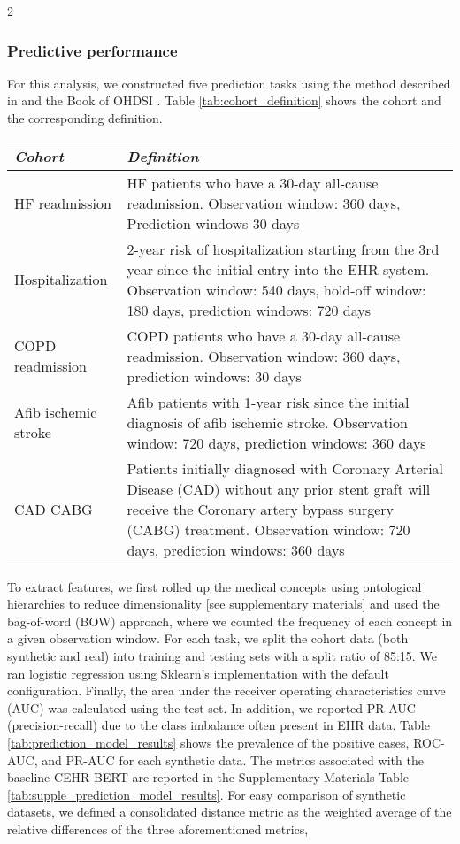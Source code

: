 \begin{multicols}{2}
\subsubsection{Predictive performance}
For this analysis, we constructed five prediction tasks using the method described in \cite{Pang2021} and the Book of OHDSI \cite{ohdsi2019book}. Table \ref{tab:cohort_definition} shows the cohort and the corresponding definition.
\begingroup
\setlength{\tabcolsep}{10pt} %
\renewcommand{\arraystretch}{1.8} %
\begin{table*}[t]
  \centering
  \begin{tabular}{p{4.0cm}p{12.0cm}}
  \toprule 
  \textit{Cohort}  & \textit{Definition}\\
  \midrule
    HF readmission & HF patients who have a 30-day all-cause readmission. Observation window: 360 days, Prediction windows 30 days \\
    Hospitalization & 2-year risk of hospitalization starting from the 3rd year since the initial entry into the EHR system. Observation window: 540 days, hold-off window: 180 days, prediction windows: 720 days  \\
    COPD readmission & COPD  patients who have a 30-day all-cause readmission. Observation window: 360 days, prediction windows: 30 days \\
    Afib ischemic stroke & Afib patients with 1-year risk since the initial diagnosis of afib ischemic stroke. Observation window: 720 days, prediction windows: 360 days \\
    CAD CABG & Patients initially diagnosed with Coronary Arterial Disease (CAD) without any prior stent graft will receive the  Coronary artery bypass surgery (CABG) treatment. Observation window: 720 days, prediction windows: 360 days\\
    \hline
  \end{tabular}
  \caption{Cohort definitions}
  \label{tab:cohort_definition}
\end{table*}
\endgroup
To extract features, we first rolled up the medical concepts using ontological hierarchies to reduce dimensionality [see supplementary materials] and used the bag-of-word (BOW) approach, where we counted the frequency of each concept in a given observation window. For each task, we split the cohort data (both synthetic and real) into training and testing sets with a split ratio of 85:15. We ran logistic regression using Sklearn's implementation with the default configuration. Finally, the area under the receiver operating characteristics curve (AUC) was calculated using the test set. In addition, we reported PR-AUC (precision-recall) due to the class imbalance often present in EHR data. Table \ref{tab:prediction_model_results} shows the prevalence of the positive cases, ROC-AUC, and PR-AUC for each synthetic data. The metrics associated with the baseline CEHR-BERT are reported in the Supplementary Materials Table \ref{tab:supple_prediction_model_results}. For easy comparison of synthetic datasets, we defined a consolidated distance metric as the weighted average of the relative differences of the three aforementioned metrics,

\end{multicols}
